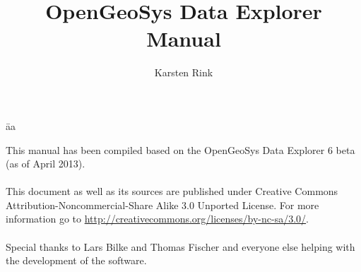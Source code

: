 \documentclass[11pt,twoside,a4paper]{book}
\title{{\LARGE OpenGeoSys Data Explorer}\\[0.5em] Manual}
\author{Karsten Rink}
\newcommand{\ogs}{OpenGeoSys }
\begin{document}
\pagestyle{empty}
\maketitle
\newpage

\vspace*{12cm}
\begin{tabbing}
\hspace*{6cm}\=aa\kill
\begin{minipage}[t]{0.62\textwidth}
\noindent This manual has been compiled based on the \ogs Data Explorer 6 beta \\
(as of April 2013).\\
\\
This document as well as its sources are published under Creative Commons Attribution-Noncommercial-Share Alike 3.0 Un\-por\-ted License. For more information go to \url{http://creativecommons.org/licenses/by-nc-sa/3.0/}. \\
\\
\noindent Special thanks to Lars Bilke and Thomas Fischer and everyone else helping with the development of the software.
\end{minipage}
\> \\
\end{tabbing}

\newpage

\tableofcontents

\cleardoublepage

\pagestyle{fancy}









%

\appendix

\cleardoublepage
{}
\printindex

\cleardoublepage


\cleardoublepage
\end{document}
